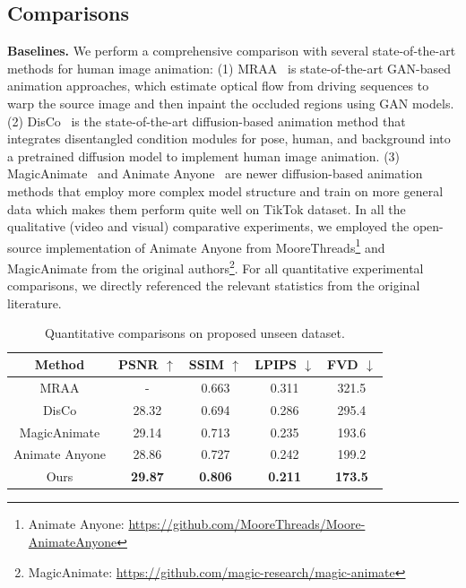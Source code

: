 \subsection{Comparisons}
\textbf{Baselines.} We perform a comprehensive comparison with several state-of-the-art methods for human image animation: (1) MRAA~\cite{siarohin2021motion} is state-of-the-art GAN-based animation approaches, which estimate optical flow from driving sequences to warp the source image and then inpaint the occluded regions using GAN models. (2) DisCo~\cite{wang2023disco} is the state-of-the-art diffusion-based animation method that integrates disentangled condition modules for pose, human, and background into a pretrained diffusion model to implement human image animation. (3) MagicAnimate~\cite{xu2023magicanimate} and Animate Anyone~\cite{hu2023animate} are newer diffusion-based animation methods that employ more complex model structure and train on more general data which makes them perform quite well on TikTok dataset.
In all the qualitative (video and visual) comparative experiments, we employed the open-source implementation of Animate Anyone from MooreThreads\footnote{\tiny Animate Anyone: \url{https://github.com/MooreThreads/Moore-AnimateAnyone}} and MagicAnimate from the original authors\footnote{\tiny MagicAnimate: \url{https://github.com/magic-research/magic-animate}}. 
For all quantitative experimental comparisons, we directly referenced the relevant statistics from the original literature.

\begin{table}[!t]
\centering
\begin{tabular}{c|cccc}
    \hline
    Method          & PSNR $\uparrow$ & SSIM $\uparrow$ & LPIPS $\downarrow$ & FVD $\downarrow$ \\ \hline
    MRAA    & -          & 0.663           & 0.311           & 321.5                                   \\
    DisCo & 28.32          & 0.694           & 0.286          & 295.4    \\ 
    MagicAnimate & 29.14          & 0.713           & 0.235          & 193.6    \\ 
    Animate Anyone  & 28.86  &  0.727  & 0.242 & 199.2\\
    Ours  & \textbf{29.87}          & \textbf{0.806}           & \textbf{0.211}          & \textbf{173.5}\\ \hline
\end{tabular} 
\vspace{1mm}
\caption{Quantitative comparisons on proposed unseen dataset.}
\vspace{-4mm}
\label{tab:quantitative_wild}
\end{table}

